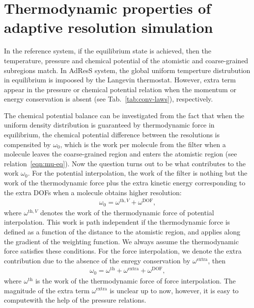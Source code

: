 \documentclass[epjST]{svjour}
\newcommand{\thf}{{\textrm{th}}}
\newcommand{\dof}{{\textrm{DOF}}}
\newcommand{\exc}{{\textrm{extra}}}
\begin{document}
      



\section{Thermodynamic properties of adaptive resolution simulation}
\label{sec:thermodynamic}

In the reference system, if the equilibrium state is achieved, then
the temperature, pressure and chemical potential of the atomistic and
coarse-grained subregions match. In AdResS system, the global uniform
temperture distrubution in equilibrium is impoosed by the Langevin
thermostat.  However, extra term appear in the pressure or chemical
potential relation when the momentum or energy conservation is absent
(see Tab.~\ref{tab:conv-laws}), respectively.

The chemical potential balance can be investigated from the fact that
when the uniform density distribution is guaranteed by thermodynamic force in equilibrium, the chemical potential
difference between the resolutions is compensited by $\omega_0$, which
is the work per molecule from the filter when a molecule leaves the
coarse-grained region and enters the atomistic region (see
relation~\eqref{eqn:mu-eq}).  Now the question turns out to be what
contributes to the work $\omega_0$.  For the potential interpolation,
the work of the filter is nothing but the work of the thermodynamic
force plus the extra kinetic energy corresponding to the extra DOFs
when a molecule obtains higher resolution:
\begin{align}\label{eqn:mu0-v}
  \omega_0 = \omega^{\thf,V} + \omega^\dof,
\end{align}
where $ \omega^{\thf,V}$ denotes the work of the thermodynamic force
of potential interpolation.
This work is path independent if the thermodynamic force is defined as a function of the distance to the atomistic region, and applies along the gradient of the weighting function.
We always assume the thermodynamic force satisfies these conditions.
For the force interpolation, 
we denote the extra contribution due to the absence of the enregy conservation
by $\omega^\exc$, then
\begin{align}\label{eqn:mu0-f}
  \omega_0 = \omega^{\thf} + \omega^\exc + \omega^\dof,
\end{align}
where $\omega^{\thf}$ is the work of the thermodynamic force of force interpolation.
The magnitude of the extra term $\omega^\exc$ is unclear up to now,
however, it is easy to computewith the help of the pressure relations.
\end{document}
